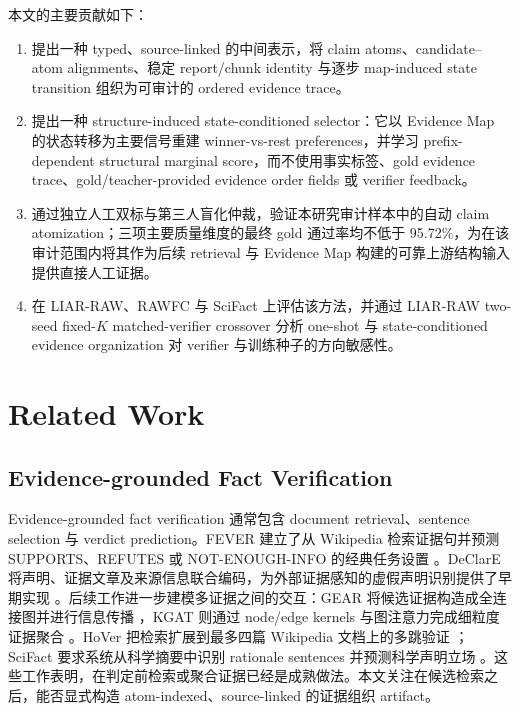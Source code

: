 \documentclass[letterpaper]{article}
\begin{document}
本文的主要贡献如下：

\begin{enumerate}
\item 提出一种 typed、source-linked 的中间表示，将 claim atoms、candidate--atom alignments、稳定 report/chunk identity 与逐步 map-induced state transition 组织为可审计的 ordered evidence trace。
\item 提出一种 structure-induced state-conditioned selector：它以 Evidence Map 的状态转移为主要信号重建 winner-vs-rest preferences，并学习 prefix-dependent structural marginal score，而不使用事实标签、gold evidence trace、gold/teacher-provided evidence order fields 或 verifier feedback。
\item 通过独立人工双标与第三人盲化仲裁，验证本研究审计样本中的自动 claim atomization；三项主要质量维度的最终 gold 通过率均不低于 95.72\%，为在该审计范围内将其作为后续 retrieval 与 Evidence Map 构建的可靠上游结构输入提供直接人工证据。
\item 在 LIAR-RAW、RAWFC 与 SciFact 上评估该方法，并通过 LIAR-RAW two-seed fixed-$K$ matched-verifier crossover 分析 one-shot 与 state-conditioned evidence organization 对 verifier 与训练种子的方向敏感性。
\end{enumerate}

\section{Related Work}

\subsection{Evidence-grounded Fact Verification}

Evidence-grounded fact verification 通常包含 document retrieval、sentence selection 与 verdict prediction。FEVER 建立了从 Wikipedia 检索证据句并预测 SUPPORTS、REFUTES 或 NOT-ENOUGH-INFO 的经典任务设置 \citep{Thorne2018FEVER}。DeClarE 将声明、证据文章及来源信息联合编码，为外部证据感知的虚假声明识别提供了早期实现 \citep{Popat2018DeClarE}。后续工作进一步建模多证据之间的交互：GEAR 将候选证据构造成全连接图并进行信息传播 \citep{Zhou2019GEAR}，KGAT 则通过 node/edge kernels 与图注意力完成细粒度证据聚合 \citep{Liu2019KGAT}。HoVer 把检索扩展到最多四篇 Wikipedia 文档上的多跳验证 \citep{Jiang2020HoVer}；SciFact 要求系统从科学摘要中识别 rationale sentences 并预测科学声明立场 \citep{Wadden2020SciFact}。这些工作表明，在判定前检索或聚合证据已经是成熟做法。本文关注在候选检索之后，能否显式构造 atom-indexed、source-linked 的证据组织 artifact。
\end{document}
